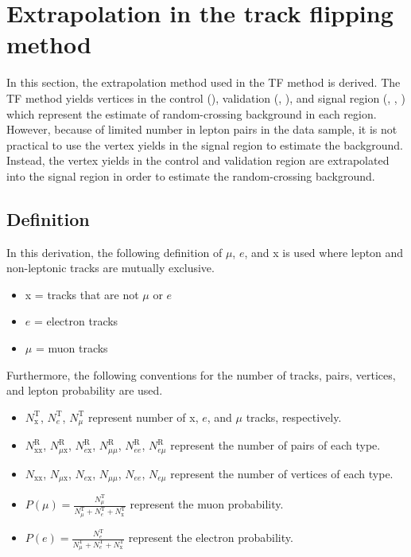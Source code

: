 \section{Extrapolation in the track flipping method}
In this section, the extrapolation method used in the TF method is derived. The TF method yields vertices in the control (\xx), validation (\mux, \ex), and signal region (\mumu, \ee, \emu) which represent the estimate of random-crossing background in each region. However, because of limited number in lepton pairs in the data sample, it is not practical to use the vertex yields in the signal region to estimate the background. Instead, the vertex yields in the control and validation region are extrapolated into the signal region in order to estimate the random-crossing background.



\subsection{Definition}
In this derivation, the following definition of $\mu$, $e$, and x is used where lepton and non-leptonic tracks are mutually exclusive.
\begin{itemize}
\item x = tracks that are not $\mu$ or $e$
\item $e$ = electron tracks
\item $\mu$ = muon tracks 
\end{itemize}

Furthermore, the following conventions for the number of tracks, pairs, vertices, and lepton probability are used.
\begin{itemize}
\item $N^{\mathrm{T}}_{\mathrm{x}}$, $N^{\mathrm{T}}_{e}$, $N^{\mathrm{T}}_{\mu}$ represent number of x, $e$, and $\mu$ tracks, respectively.
\item $N^{\mathrm{R}}_{\mathrm{xx}}$, $N^{\mathrm{R}}_{\mu \mathrm{x}}$, $N^{\mathrm{R}}_{e\mathrm{x}}$, $N^{\mathrm{R}}_{\mu\mu}$, $N^{\mathrm{R}}_{ee}$, $N^{\mathrm{R}}_{e\mu}$ represent the number of pairs of each type.
\item $N_{\mathrm{xx}}$, $N_{\mu \mathrm{x}}$, $N_{e\mathrm{x}}$, $N_{\mu\mu}$, $N_{ee}$, $N_{e\mu}$ represent the number of vertices of each type.
\item $P(\mu) = \frac{N^{\mathrm{T}}_{\mu}}{N^{\mathrm{T}}_{\mu} + N^{\mathrm{T}}_{e} + N^{\mathrm{T}}_{\mathrm{x}}}$ represent the muon probability.
\item $P(e) = \frac{N^{\mathrm{T}}_{e}}{N^{\mathrm{T}}_{\mu} + N^{\mathrm{T}}_{e} + N^{\mathrm{T}}_{\mathrm{x}}}$ represent the electron probability.
\end{itemize}


